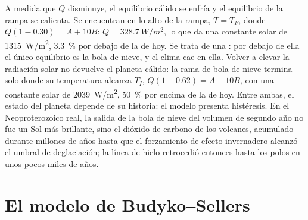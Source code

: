 \begin{omfigure}
\par{}\label{fig:b3:climate-models:zero-d}
\end{omfigure}

A medida que $Q$ disminuye, el equilibrio cálido se enfría y el equilibrio de la rampa se calienta.
Se encuentran en lo alto de la rampa, $T = T_F$, donde $Q(1 - 0.30) = A +
10B$: $Q = \qty{328.7}{W/m^2}$, lo que da una constante solar de \qty{1315}{W/m^2},
\qty{3.3}{\percent} por debajo de la de hoy. Se trata de una : por debajo
de ella el único equilibrio es la bola de nieve, y el clima cae en ella.
Volver a elevar la radiación solar no devuelve el planeta cálido: la rama de bola de nieve
termina solo donde su temperatura alcanza $T_I$, $Q(1 - 0.62) = A -
10B$, con una constante solar de \qty{2039}{W/m^2}, \qty{50}{\percent} por encima
de la de hoy. Entre ambas, el estado del planeta depende de su historia:
el modelo presenta histéresis. En el Neoproterozoico real, la salida de la
bola de nieve del volumen de segundo año no fue un Sol más brillante, sino el dióxido de carbono
de los volcanes, acumulado durante millones de años hasta que el
forzamiento de efecto invernadero alcanzó el umbral de deglaciación; la línea de hielo retrocedió entonces hasta
los polos en unos pocos miles de años.

\section{El modelo de Budyko--Sellers}\label{sec:b3:climate-models:budyko-sellers}

